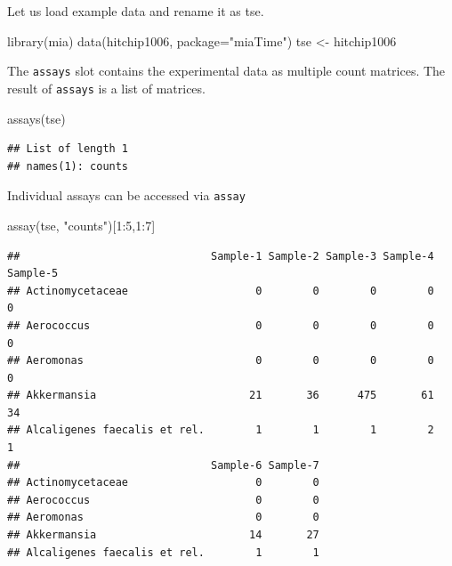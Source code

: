 \documentclass[
]{book}
\newenvironment{Shaded}{\begin{snugshade}}{\end{snugshade}}
\newcommand{\AttributeTok}[1]{\textcolor[rgb]{0.77,0.63,0.00}{#1}}
\newcommand{\DecValTok}[1]{\textcolor[rgb]{0.00,0.00,0.81}{#1}}
\newcommand{\FunctionTok}[1]{\textcolor[rgb]{0.00,0.00,0.00}{#1}}
\newcommand{\NormalTok}[1]{#1}
\newcommand{\OtherTok}[1]{\textcolor[rgb]{0.56,0.35,0.01}{#1}}
\newcommand{\SpecialCharTok}[1]{\textcolor[rgb]{0.00,0.00,0.00}{#1}}
\newcommand{\StringTok}[1]{\textcolor[rgb]{0.31,0.60,0.02}{#1}}
\begin{document}
Let us load example data and rename it as tse.

\begin{Shaded}
\begin{Highlighting}[]
\FunctionTok{library}\NormalTok{(mia)}
\FunctionTok{data}\NormalTok{(hitchip1006, }\AttributeTok{package=}\StringTok{"miaTime"}\NormalTok{)}
\NormalTok{tse }\OtherTok{\textless{}{-}}\NormalTok{ hitchip1006}
\end{Highlighting}
\end{Shaded}

The \texttt{assays} slot contains the experimental data as multiple count matrices. The result of \texttt{assays} is a list of matrices.

\begin{Shaded}
\begin{Highlighting}[]
\FunctionTok{assays}\NormalTok{(tse)}
\end{Highlighting}
\end{Shaded}

\begin{verbatim}
## List of length 1
## names(1): counts
\end{verbatim}

Individual assays can be accessed via \texttt{assay}

\begin{Shaded}
\begin{Highlighting}[]
\FunctionTok{assay}\NormalTok{(tse, }\StringTok{"counts"}\NormalTok{)[}\DecValTok{1}\SpecialCharTok{:}\DecValTok{5}\NormalTok{,}\DecValTok{1}\SpecialCharTok{:}\DecValTok{7}\NormalTok{]}
\end{Highlighting}
\end{Shaded}

\begin{verbatim}
##                              Sample-1 Sample-2 Sample-3 Sample-4 Sample-5
## Actinomycetaceae                    0        0        0        0        0
## Aerococcus                          0        0        0        0        0
## Aeromonas                           0        0        0        0        0
## Akkermansia                        21       36      475       61       34
## Alcaligenes faecalis et rel.        1        1        1        2        1
##                              Sample-6 Sample-7
## Actinomycetaceae                    0        0
## Aerococcus                          0        0
## Aeromonas                           0        0
## Akkermansia                        14       27
## Alcaligenes faecalis et rel.        1        1
\end{verbatim}
\end{document}
